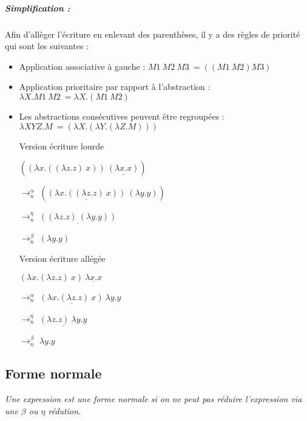 \documentclass[10pt,a4paper]{report}
\begin{document}
\subparagraph{Simplification :} Afin d'allèger l'écriture en enlevant des parenthèses, il y a des règles de priorité qui sont les suivantes :
\begin{itemize}
\item Application associative à gauche : $M1~M2~M3~= ((M1~M2)M3)$
\item Application prioritaire par rapport à l'abstraction : $\lambda X.M1~M2~= \lambda X.(M1~M2)$
\item Les abstractions consécutives peuvent être regroupées : $\lambda XYZ.M~= (\lambda X.(\lambda Y.(\lambda Z.M)))$
\end{itemize}
\medbreak

\begin{multicols}{2}{
    \begin{itemize}
    \item[] Version écriture lourde
    \item[] $((\lambda x.((\lambda z.z)~x))~\underline{(\lambda x.x)})$
    \item[$\rightarrow_{n}^{\alpha}$] $(\underline{(\lambda x.((\lambda z.z)~x))}~(\lambda y.y))$
    \item[$\rightarrow_{n}^{\eta}$] $\underline{((\lambda z.z)~(\lambda y.y))}$
    \item[$\rightarrow_{n}^{\beta}$] $(\lambda y.y)$
    \end{itemize}
    
    \begin{itemize}
    \item[] Version écriture allégée
    \item[] $(\lambda x.(\lambda z.z)~x)~\underline{\lambda x.x}$
    \item[$\rightarrow_{n}^{\alpha}$] $\underline{(\lambda x.(\lambda z.z)~x)}~\lambda y.y$
    \item[$\rightarrow_{n}^{\eta}$] $\underline{(\lambda z.z)~\lambda y.y}$
    \item[$\rightarrow_{n}^{\beta}$] $\lambda y.y$
    \end{itemize}
  }
\end{multicols}
\bigbreak


\subsection{Forme normale}
\textit{Une expression est une forme normale si on ne peut pas réduire l'expression via une $\beta$ ou $\eta$ rédution.}
\medbreak
\end{document}
